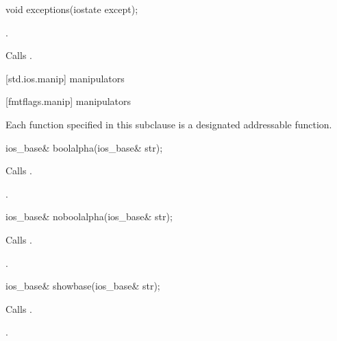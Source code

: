 %
\begin{itemdecl}
void exceptions(iostate except);
\end{itemdecl}

\begin{itemdescr}
\pnum
\ensures
{}.

\pnum
\effects
Calls
.
\end{itemdescr}

[std.ios.manip]{ manipulators}

[fmtflags.manip]{ manipulators}

\pnum
Each function specified in this subclause
is a designated addressable function.

\begin{indexed}{}
\begin{itemdecl}
ios_base& boolalpha(ios_base& str);
\end{itemdecl}
\end{indexed}

\begin{itemdescr}
\pnum
\effects
Calls
.

\pnum
\returns
{}.
\end{itemdescr}

\begin{indexed}{}
\begin{itemdecl}
ios_base& noboolalpha(ios_base& str);
\end{itemdecl}
\end{indexed}

\begin{itemdescr}
\pnum
\effects
Calls
.

\pnum
\returns
{}.
\end{itemdescr}

\begin{indexed}{}
\begin{itemdecl}
ios_base& showbase(ios_base& str);
\end{itemdecl}
\end{indexed}

\begin{itemdescr}
\pnum
\effects
Calls
.

\pnum
\returns
{}.
\end{itemdescr}

